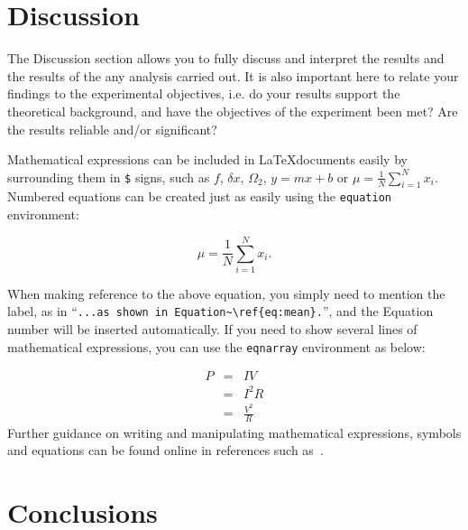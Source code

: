 \documentclass[11pt, a4paper]{article}
\begin{document}
\section{Discussion}

The Discussion section allows you to fully discuss and interpret the results and the results of the any analysis carried out. It is also important here to relate your findings to the experimental objectives, i.e. do your results support the theoretical background, and have the objectives of the experiment been met? Are the results reliable and/or significant?

Mathematical expressions can be included in \LaTeX documents easily by surrounding them in \verb|$| signs, such as $f$, $\delta x$, $\Omega_2$, $y=mx+b$ or $\mu = \frac{1}{N}\sum_{i=1}^N x_i$. Numbered equations can be created just as easily using the \verb|equation| environment:

\begin{equation}
\mu = \frac{1}{N}\sum_{i=1}^N x_i.
\label{eq:mean}
\end{equation}

When making reference to the above equation, you simply need to mention the label, as in ``\verb|...as shown in Equation~\ref{eq:mean}.|'', and the Equation number will be inserted automatically. If you need to show several lines of mathematical expressions, you can use the \verb|eqnarray| environment as below:

\begin{eqnarray}
  P & = & I V             \\
    & = & I^2 R           \\
    & = & \frac{V^2}{R}
\label{eq:power}
\end{eqnarray}
Further guidance on writing and manipulating mathematical expressions, symbols and equations can be found online in references such as~\cite{ref:Maths}.

\section{Conclusions}
\end{document}

